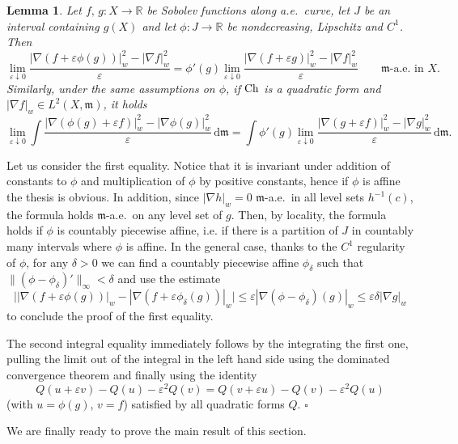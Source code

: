 \documentclass[reqno,11pt]{article}
\numberwithin{equation}{section}
\newcommand{\C}{\mathbb{C}}
\newcommand{\R}{\mathbb{R}}
\newcommand{\mm}{{\mbox{\boldmath$m$}}}
\renewcommand{\d}{{\mathrm d}}
\newcommand{\eps}{\varepsilon}
\newenvironment{proof}{\removelastskip\par\medskip   %
\noindent{\em Proof.}
\rm}{\penalty-20\null\hfill$\square$\par\medbreak}
\newtheorem{lemma}[theorem]{Lemma}
\newcommand{\weakgrad}[1]{|\nabla #1|_w}                %
\renewcommand{\C}{{\rm Ch}}
\renewcommand{\mm}{\mathfrak m}
\begin{document}
\begin{lemma}\label{le:chains}
Let $f,\,g:X\to\R$ be Sobolev functions along a.e.~curve, let $J$ be
an interval containing $g(X)$ and let $\phi:J\to\R$ be
nondecreasing, Lipschitz and $C^1$. Then
\[
\lim_{\eps\downarrow 0}\frac{\weakgrad{(f+\eps\phi(g))}^2-\weakgrad
f^2}{\eps} =\phi'(g)\lim_{\eps\downarrow 0}\frac{\weakgrad{(f+\eps
g)}^2-\weakgrad f^2}{\eps}\qquad\text{$\mm$-a.e.~in $X$.}
\]
Similarly, under the same assumptions on $\phi$, if $\C$ is a
quadratic form and $\weakgrad{f}\in L^2(X,\mm)$, it holds
\[
\lim_{\eps\downarrow 0}\int\frac{\weakgrad{(\phi(g)+\eps
f)}^2-\weakgrad{\phi(g)}^2}{\eps}\,\d\mm=\int
\phi'(g)\lim_{\eps\downarrow 0}\frac{\weakgrad{(g+\eps
f)}^2-\weakgrad g^2}{\eps}\,\d\mm.
\]
\end{lemma}
\begin{proof} Let us consider the first equality. Notice that it is
invariant under addition of constants to $\phi$ and multiplication
of $\phi$ by positive constants, hence if $\phi$ is affine the
thesis is obvious. In addition, since $\weakgrad{h}=0$ $\mm$-a.e.~in
all level sets $h^{-1}(c)$, the formula holds $\mm$-a.e.~on any
level set of $g$. Then, by locality, the formula holds if $\phi$ is
countably piecewise affine, i.e. if there is a partition of $J$ in
countably many intervals where $\phi$ is affine. In the general
case, thanks to the $C^1$ regularity of $\phi$, for any $\delta>0$
we can find a countably piecewise affine $\phi_\delta$ such that
$\|(\phi-\phi_\delta)'\|_\infty<\delta$ and use the estimate
\[
\big|\weakgrad{(f+\eps\phi(g))}-\weakgrad{(f+\eps\phi_\delta(g))}\big|
\leq\eps \weakgrad{(\phi-\phi_\delta)(g)}\leq\eps\delta\weakgrad{g}
\]
to conclude the proof of the first equality.

The second integral equality immediately follows by the integrating
the first one, pulling the limit out of the integral in the left
hand side using the dominated convergence theorem and finally using
the identity
\begin{equation}\label{eq:shift}
Q(u+\eps v)-Q(u)-\eps^2 Q(v)=Q(v+\eps u)-Q(v)-\eps^2Q(u)
\end{equation}
(with $u=\phi(g)$, $v=f$) satisfied by all quadratic forms $Q$.
\end{proof}
%
We are finally ready to prove the main result of this section.
%
\end{document}
